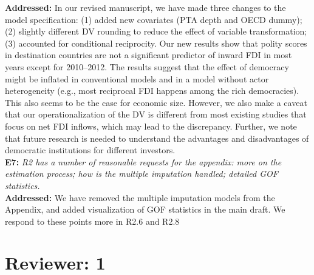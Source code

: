 \documentclass[a4paper,11pt]{texMemo}
\begin{document}
\noindent \textbf{Addressed:} In our revised manuscript, we have made three changes to the model specification: (1) added new covariates (PTA depth and OECD dummy); (2) slightly different DV rounding to reduce the effect of variable transformation; (3) accounted for conditional reciprocity. Our new results show that polity scores in destination countries are not a significant predictor of inward FDI in most years except for 2010--2012. The results suggest that the effect of democracy might be inflated in conventional models and in a model without actor heterogeneity (e.g., most reciprocal FDI happens among the rich democracies). This also seems to be the case for economic size. However, we also make a caveat that our operationalization of the DV is different from most existing studies that focus on net FDI inflows, which may lead to the discrepancy. Further, we note that future research is needed to understand the advantages and disadvantages of democratic institutions for different investors.\\

\noindent \textbf{E7:} \emph{R2 has a number of reasonable requests for the appendix: more on the estimation process; how is the multiple imputation handled; detailed GOF statistics.}\\

\noindent \textbf{Addressed:} We have removed the multiple imputation models from the Appendix, and added visualization of GOF statistics in the main draft. We respond to these points more in R2.6 and R2.8\\


\section*{Reviewer: 1}
\end{document}
